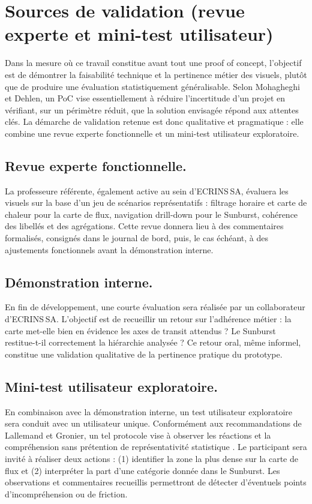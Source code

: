 \section{Sources de validation (revue experte et mini-test utilisateur)}
\label{sec:validation-sources}

Dans la mesure où ce travail constitue avant tout une proof of
concept, l’objectif est de démontrer la faisabilité technique et la pertinence
métier des visuels, plutôt que de produire une évaluation statistiquement
généralisable. Selon Mohagheghi et Dehlen, un PoC vise essentiellement à
réduire l’incertitude d’un projet en vérifiant, sur un périmètre réduit, que
la solution envisagée répond aux attentes clés\parencite{MohagheghiPoC2008}.
La démarche de validation retenue est donc qualitative et pragmatique : elle
combine une revue experte fonctionnelle et un mini-test utilisateur
exploratoire.

\subsection{Revue experte fonctionnelle.}
La professeure référente, également active au sein d’ECRINS SA, évaluera les
visuels sur la base d’un jeu de scénarios représentatifs : filtrage
horaire et carte de chaleur pour la carte de flux, navigation drill-down pour le
Sunburst, cohérence des libellés et des agrégations. Cette revue donnera lieu
à des commentaires formalisés, consignés dans le journal de bord, puis, le cas
échéant, à des ajustements fonctionnels avant la démonstration interne.

\subsection{Démonstration interne.}
En fin de développement, une courte évaluation sera réalisée par un
collaborateur d’ECRINS SA. L’objectif
est de recueillir un retour  sur l’adhérence métier :
la carte met-elle bien en évidence les axes de transit attendus ?
Le Sunburst restitue-t-il correctement la hiérarchie analysée ?  
Ce retour oral, même informel, constitue une validation qualitative de la
pertinence pratique du prototype.

\subsection{Mini-test utilisateur exploratoire.}
En combinaison avec la démonstration interne, un test utilisateur exploratoire sera conduit avec un
utilisateur unique. Conformément aux recommandations de Lallemand et
Gronier, un tel protocole vise à observer les réactions et la
compréhension sans prétention de représentativité statistique
\parencite{LallemandUX2016}. Le participant sera invité à réaliser deux
actions : (1) identifier la zone la plus dense sur la carte de flux et
(2) interpréter la part d’une catégorie donnée dans le Sunburst. Les
observations et commentaires recueillis permettront de détecter d’éventuels
points d’incompréhension ou de friction.

